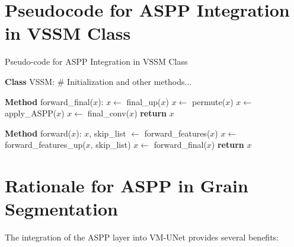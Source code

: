 \documentclass[conference]{IEEEtran}
\begin{document}
\section{Pseudocode for ASPP Integration in VSSM Class}

\begin{algorithm}[H]
\caption{Pseudo-code for ASPP Integration in VSSM Class}\label{alg:vssm}
\begin{algorithmic}[1]
\State \textbf{Class} VSSM:
\State \hspace{0.5cm} \# Initialization and other methods...

\State \hspace{0.5cm} \textbf{Method} forward\_final($x$):
\State \hspace{1cm} $x \gets$ final\_up($x$)
\State \hspace{1cm} $x \gets$ permute($x$)
\State \hspace{1cm} $x \gets$ apply\_ASPP($x$)  
\State \hspace{1cm} $x \gets$ final\_conv($x$)
\State \hspace{1cm} \textbf{return} $x$

\State \hspace{0.5cm} \textbf{Method} forward($x$):
\State \hspace{1cm} $x$, skip\_list $\gets$ forward\_features($x$)
\State \hspace{1cm} $x \gets$ forward\_features\_up($x$, skip\_list)
\State \hspace{1cm} $x \gets$ forward\_final($x$)
\State \hspace{1cm} \textbf{return} $x$
\end{algorithmic}
\end{algorithm}

\section{Rationale for ASPP in Grain Segmentation}
The integration of the ASPP layer into VM-UNet provides several benefits:
\end{document}
